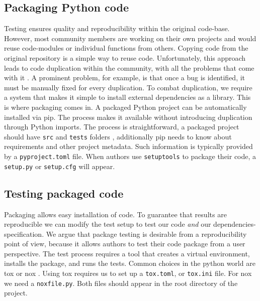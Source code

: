 \subsection{Packaging Python code}\label{sec:packaging}

Testing ensures quality and reproducibility within the original code-base.
However, most community members are working on their own projects and would reuse code-modules or individual functions from others. Copying code from the original repository is a simple way to reuse code. Unfortunately, this approach leads to code duplication within the community,
with all the problems that come with it \cite{Yasset2016TenGit}. 
A prominent problem, for example, is that once a bug is identified, it must be manually fixed for every duplication. To combat duplication, we require a system that makes it simple to install external dependencies as a library. This is where packaging comes in.
A packaged Python project can be automatically installed via \ac{pip}.
The process makes it available without introducing duplication through Python imports.
The process is straightforward, a packaged project should have \texttt{src} and \texttt{tests}
folders \cite{packaging2025python}, additionally \ac{pip} needs to know about requirements
and other project metadata. Such information is typically provided by a  \texttt{pyproject.toml} file. 
When authors use \texttt{setuptools} \cite{setuptools2025docs} to package their code,
a \texttt{setup.py} or \texttt{setup.cfg} will appear. 

\subsection{Testing packaged code}

Packaging allows easy installation of code. To guarantee that results are reproducible
we can modify the test setup to test our code \textit{and} our dependencies-specification.
We argue that package testing is desirable from a reproducibility point of view, because
it allows authors to test their code package from a user perspective. 
The test process requires a tool that creates a virtual environment, installs the package,
and runs the tests.
Common choices in the python world are tox \cite{tox2025docs} or
nox \cite{nox2025docs}. Using tox requires us to set up a \texttt{tox.toml}, or \texttt{tox.ini} file.
For nox we need a \texttt{noxfile.py}. Both files should appear in the root directory of the project.

